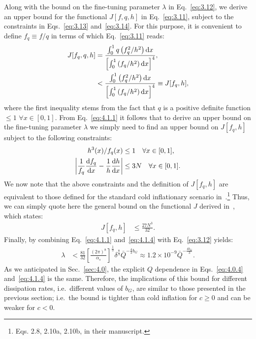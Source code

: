 \documentclass[aps,prd,twocolumn,amssymb,amsmath,floatfix,nofootinbib,superscriptaddress,preprintnumbers]{revtex4-1}
\begin{document}
Along with the bound on the fine-tuning parameter $\lambda$ in Eq.~\ref{eq:3.12}, we derive an upper bound for the functional $J[f,q,h]$ in Eq.~\ref{eq:3.11}, subject to the constraints in Eqs.~\ref{eq:3.13} and~\ref{eq:3.14}. For this purpose, it is convenient to define $f_q\equiv f/q$ in terms of which Eq.~\ref{eq:3.11} reads:
\begin{align}
    J[f_q, q,h]&= \frac{\int_{0}^{1}q\left(f_q^{2} / h^{2}\right) {\rm d} x}{\left[\int_{0}^{1}\left(f_q/ h^{2}\right) {\rm d} x\right]^{4}}, \nonumber \\
    &< \frac{\int_{0}^{1}\left(f_q^{2} / h^{2}\right) {\rm d} x}{\left[\int_{0}^{1}\left(f_q / h^{2}\right) {\rm d} x\right]^{4}}\equiv J[f_q,h], \label{eq:4.1.1}
\end{align}
where the first inequality stems from the fact that $q$ is a positive definite function $\leq 1$ $\forall x \in[0,1]$. From Eq.~\ref{eq:4.1.1} it follows that to derive an upper bound on the fine-tuning parameter $\lambda$ we simply need to find an upper bound on $J[f_q,h]$ subject to the following constraints:
\begin{align}
    h^3(x)/f_q(x)&\leq 1 \quad \forall x \in[0,1], \label{eq:4.1.2}\\
\left|\frac{1}{f_q} \frac{{\rm d} f_q}{{\rm d} x} -\frac{1}{h}\frac{{\rm d} h}{{\rm d} x}\right| &\leq 3 N\quad \forall x \in[0,1]. \label{eq:4.1.3}
\end{align}
We now note that the above constraints and the definition of $J[f_q,h]$ are equivalent to those defined for the standard cold inflationary scenario in~\cite{Adams:1990pn}.\footnote{Eqs. 2.8, 2.10a, 2.10b, in their manuscript.} Thus, we can simply quote here the general bound on the functional $J$ derived in~\cite{Adams:1990pn}, which states:
\begin{align} J[f_q,h]&\leq \frac{27N^3}{32}. \label{eq:4.1.4}
\end{align}
Finally, by combining Eq.~\ref{eq:4.1.1} and~\ref{eq:4.1.4} with Eq.~\ref{eq:3.12} yields:
\begin{align}
    \lambda &< \frac{81}{32}\left[\frac{(2\pi)^8}{\alpha_s}\right]^{\frac{1}{3}}\delta^{\frac{8}{3}} \bar{Q}^{-\frac{4}{3}b_G}\approx 1.2\times 10^{-9} \bar{Q}^{-\frac{4b_G}{3}}. \label{eq:4.1.5}
\end{align}
As we anticipated in Sec.~\ref{sec:4.0}, the explicit $Q$ dependence in Eqs.~\ref{eq:4.0.4} and~\ref{eq:4.1.4} is the same. Therefore, the implications of this bound for different dissipation rates, i.e.\ different values of $b_G$, are similar to those presented in the previous section; i.e.\ the bound is tighter than cold inflation for $c\geq0$ and can be weaker for $c<0$.
\end{document}
